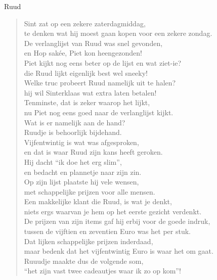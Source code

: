 \documentclass[12pt]{brief}
\date{11 december 2005}
\begin{document}
\begin{letter}{Ruud}

\opening{}


\begin{verse}

Sint zat op een zekere zaterdagmiddag,\\
te denken wat hij moest gaan kopen voor een zekere zondag.\\
De verlanglijst van Ruud was snel gevonden,\\
en Hop sak\'ee, Piet kon heengezonden!\\[0.5em]

Piet kijkt nog eens beter op de lijst en wat ziet-ie?\\
die Ruud lijkt eigenlijk best wel sneeky!\\
Welke truc probeert Ruud namelijk uit te halen?\\
hij wil Sinterklaas wat extra laten betalen!\\
Tenminste, dat is zeker waarop het lijkt,\\
nu Piet nog eens goed naar de verlanglijst kijkt.\\[0.5em]

Wat is er namelijk aan de hand?\\
Ruudje is behoorlijk bijdehand.\\
Vijfentwintig is wat was afgesproken,\\
en dat is waar Ruud zijn kans heeft geroken.\\
Hij dacht ``ik doe het erg slim'',\\
en bedacht en plannetje naar zijn zin.\\[0.5em]

Op zijn lijst plaatste hij vele wensen,\\
met schappelijke prijzen voor alle mensen.\\
Een makkelijke klant die Ruud, is wat je denkt,\\
niets ergs waarvan je hem op het eerste gezicht verdenkt.\\[0.5em]

De prijzen van zijn items gaf hij erbij voor de goede indruk,\\
tussen de vijftien en zeventien Euro was het per stuk.\\
Dat lijken schappelijke prijzen inderdaad,\\
maar bedenk dat het vijfentwintig Euro is waar het om gaat.\\
Ruuudje maakte dus de volgende som,\\
``het zijn vast twee cadeautjes waar ik zo op kom''!\\[0.5em]


\end{verse}
\end{letter}
\end{document}

